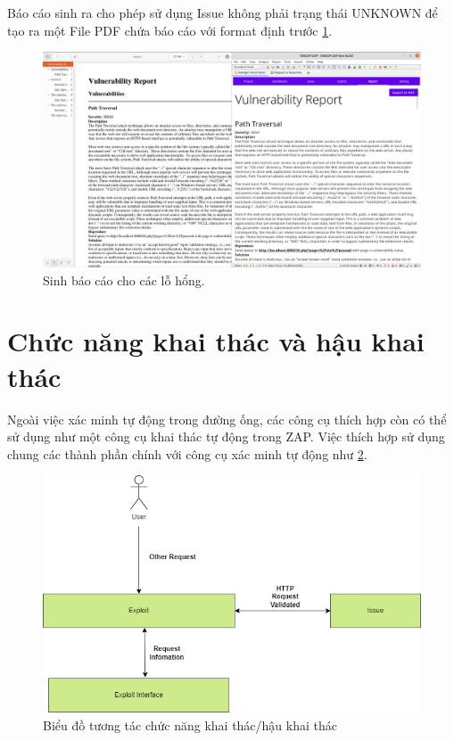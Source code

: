 \documentclass[./../main.tex]{subfiles}
\begin{document}
Báo cáo sinh ra cho phép sử dụng Issue không phải trạng thái
UNKNOWN để tạo ra một File PDF chứa báo cáo với format định trước \ref{fig:report}.

\begin{figure}[ht!]
	\includegraphics[width=\linewidth]{./images/report.png}
	\caption{Sinh báo cáo cho các lỗ hổng.}
	\label{fig:report}
\end{figure}

\section{Chức năng khai thác và hậu khai thác}

Ngoài việc xác minh tự động trong đường ống, các công cụ thích
hợp còn có thể sử dụng như một công cụ khai thác tự động trong ZAP.
Việc thích hợp sử dụng chung các thành phần chính với công cụ xác minh
tự động như \ref{fig:exploit}.

\begin{figure}[ht!]
	\includegraphics[width=\linewidth]{./images/exploit.png}
	\caption{Biểu đồ tương tác chức năng khai thác/hậu khai thác}
	\label{fig:exploit}
\end{figure}
\end{document}
